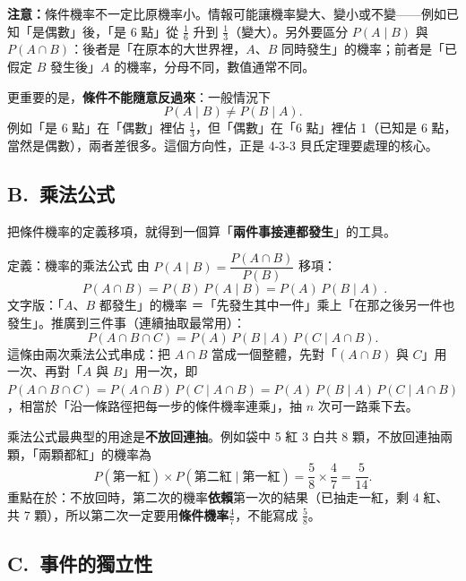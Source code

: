 \documentclass[11pt]{article}
\begin{document}
\textbf{注意：}條件機率不一定比原機率小。情報可能讓機率變大、變小或不變——例如已知「是偶數」後，「是 6 點」從 $\frac16$ 升到 $\frac13$（變大）。另外要區分 $P(A\mid B)$ 與 $P(A\cap B)$：後者是「在原本的大世界裡，$A$、$B$ 同時發生」的機率；前者是「已假定 $B$ 發生後」$A$ 的機率，分母不同，數值通常不同。

更重要的是，\textbf{條件不能隨意反過來}：一般情況下
$$P(A\mid B)\neq P(B\mid A).$$
例如「是 6 點」在「偶數」裡佔 $\frac13$，但「偶數」在「6 點」裡佔 1（已知是 6 點，當然是偶數），兩者差很多。這個方向性，正是 4-3-3 貝氏定理要處理的核心。

\subsection*{\sffamily B.\ 乘法公式}

把條件機率的定義移項，就得到一個算「\textbf{兩件事接連都發生}」的工具。

\begin{補充框}{定義：機率的乘法公式}
由 $P(A\mid B)=\dfrac{P(A\cap B)}{P(B)}$ 移項：
$$\boxed{\;P(A\cap B)=P(B)\,P(A\mid B)=P(A)\,P(B\mid A)\;}.$$
文字版：「$A$、$B$ 都發生」的機率 ＝「先發生其中一件」乘上「在那之後另一件也發生」。推廣到三件事（連續抽取最常用）：
$$P(A\cap B\cap C)=P(A)\,P(B\mid A)\,P(C\mid A\cap B).$$
這條由兩次乘法公式串成：把 $A\cap B$ 當成一個整體，先對「$(A\cap B)$ 與 $C$」用一次、再對「$A$ 與 $B$」用一次，即 $P(A\cap B\cap C)=P(A\cap B)\,P(C\mid A\cap B)=P(A)\,P(B\mid A)\,P(C\mid A\cap B)$，相當於「沿一條路徑把每一步的條件機率連乘」，抽 $n$ 次可一路乘下去。
\end{補充框}

乘法公式最典型的用途是\textbf{不放回連抽}。例如袋中 5 紅 3 白共 8 顆，不放回連抽兩顆，「兩顆都紅」的機率為
$$P(\text{第一紅})\times P(\text{第二紅}\mid\text{第一紅})=\frac58\times\frac47=\frac{5}{14}.$$
重點在於：不放回時，第二次的機率\textbf{依賴}第一次的結果（已抽走一紅，剩 4 紅、共 7 顆），所以第二次一定要用\textbf{條件機率}$\frac47$，不能寫成 $\frac58$。


\subsection*{\sffamily C.\ 事件的獨立性}
\end{document}
